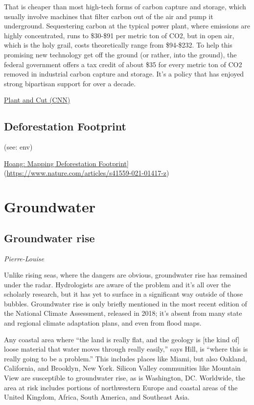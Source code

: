 \documentclass[
]{book}
\begin{document}
That is cheaper than most high-tech forms of carbon capture and storage, which usually involve machines that filter carbon out of the air and pump it underground. Sequestering carbon at the typical power plant, where emissions are highly concentrated, runs to \$30-\$91 per metric ton of CO2, but in open air, which is the holy grail, costs theoretically range from \$94-\$232. To help this promising new technology get off the ground (or rather, into the ground), the federal government offers a tax credit of about \$35 for every metric ton of CO2 removed in industrial carbon capture and storage. It's a policy that has enjoyed strong bipartisan support for over a decade.

\href{https://edition.cnn.com/2021/02/10/opinions/climate-plant-and-cut-trees-down-bader/index.html}{Plant and Cut (CNN)}

\hypertarget{deforestation-footprint}{%
\section{Deforestation Footprint}\label{deforestation-footprint}}

(see: env)

\href{Nature,\%20paywall}{Hoang: Mapping Deforestation Footprint}{]}(\url{https://www.nature.com/articles/s41559-021-01417-z})

\hypertarget{groundwater}{%
\chapter{Groundwater}\label{groundwater}}

\hypertarget{groundwater-rise}{%
\section{Groundwater rise}\label{groundwater-rise}}

\emph{Pierre-Louise}

Unlike rising seas, where the dangers are obvious, groundwater rise has remained under the radar. Hydrologists are aware of the problem and it's all over the scholarly research, but it has yet to surface in a significant way outside of those bubbles. Groundwater rise is only briefly mentioned in the most recent edition of the National Climate Assessment, released in 2018; it's absent from many state and regional climate adaptation plans, and even from flood maps.

Any coastal area where ``the land is really flat, and the geology is {[}the kind of{]} loose material that water moves through really easily,'' says Hill, is ``where this is really going to be a problem.'' This includes places like Miami, but also Oakland, California, and Brooklyn, New York. Silicon Valley communities like Mountain View are susceptible to groundwater rise, as is Washington, DC. Worldwide, the area at risk includes portions of northwestern Europe and coastal areas of the United Kingdom, Africa, South America, and Southeast Asia.
\end{document}
